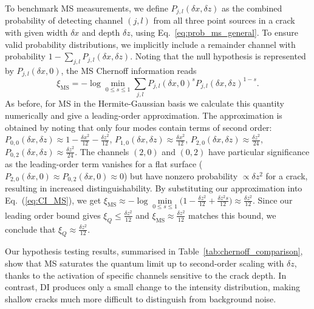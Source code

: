\documentclass[reprint,amsmath,amssymb,aps,prl,floatfix,groupedaddress,superscriptaddress]{revtex4-2}
\begin{document}
To benchmark MS measurements, we define $P_{j,l}(\delta x, \delta z)$ as the combined probability of detecting channel $(j,l)$ from all three point sources in a crack with given width $\delta x$ and depth $\delta z$, using Eq.~\eqref{eq:prob_ms_general}. To ensure valid probability distributions, we implicitly include a remainder channel with probability $1 - \sum_{j,l} P_{j,l}(\delta x, \delta z)$.
Noting that the null hypothesis is represented by $P_{j,l}(\delta x, 0)$,
the MS Chernoff information reads
\begin{equation} \label{eq:CI_MS}
\xi_{\textrm{MS}} = -\log \min_{0 \leq s \leq 1} \mbox{$\sum_{j,l} P_{j,l}(\delta x, 0)^s P_{j,l}(\delta x, \delta z)^{1-s}$}.
\end{equation}
As before, for MS in the Hermite-Gaussian basis we calculate this quantity numerically and give a leading-order approximation.
The approximation is obtained by noting that only four modes contain terms of second order:
		$P_{0,0}(\delta x, \delta z) \approx 1 - \frac{\delta x^2}{12} - \frac{\delta z^2}{12}$,
        $P_{1,0}(\delta x, \delta z) \approx \frac{\delta x^2}{12}$,
		$P_{2,0}(\delta x, \delta z) \approx \frac{\delta z^2}{24}$,
		$P_{0,2}(\delta x, \delta z) \approx \frac{\delta z^2}{24}$.
The channels $(2,0)$ and $(0,2)$ have particular significance as the leading-order term vanishes for a flat surface ($P_{2,0}(\delta x, 0) \approx P_{0,2}(\delta x, 0) \approx 0$) but have nonzero probability $\propto \delta z^2$ for a crack, resulting in  increased distinguishability.
By substituting our approximation into Eq.~(\ref{eq:CI_MS}), we get $\xi_{\textrm{MS}}  \approx -\log \min\limits_{0 \leq s \leq 1} \big(1  - \frac{\delta z^2}{12} + \frac{\delta z^2 s}{12} \big) \approx \frac{\delta z^2}{12}$. Since our leading order bound gives $\xi_Q \leq \frac{\delta z^2}{12}$ and $\xi_{\textrm{MS}}  \approx \frac{\delta z^2}{12}$ matches this bound, we conclude that $\xi_Q \approx \frac{\delta z^2}{12}$.

 Our hypothesis testing results, summarised in Table~\ref{tab:chernoff_comparison}, show that MS saturates the quantum limit up to second-order scaling with $\delta z$, thanks to the activation of specific channels sensitive to the crack depth. In contrast, DI produces only a small change to the intensity distribution, making shallow cracks much more difficult to distinguish from background noise.
\end{document}
